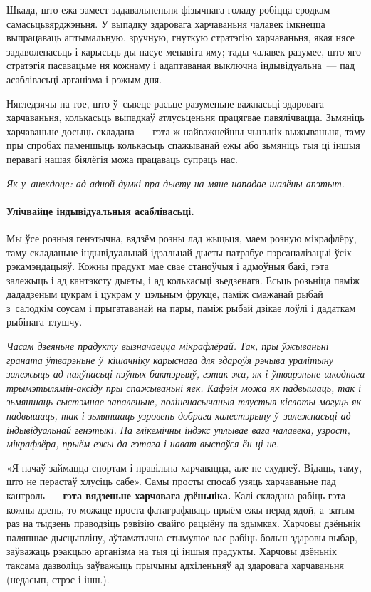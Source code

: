 Шкада, што ежа замест задавальненьня фізычнага голаду робіцца сродкам самасьцьвярджэньня. У выпадку здаровага харчаваньня чалавек імкнецца выпрацаваць аптымальную, зручную, гнуткую стратэгію харчаваньня, якая нясе задаволенасьць і карысьць ды пасуе менавіта яму; тады чалавек разумее, што яго стратэгія пасавацьме ня кожнаму і адаптаваная выключна індывідуальна~--- пад асаблівасьці арганізма і рэжым дня.

Нягледзячы на тое, што ў~сьвеце расьце разуменьне важнасьці здаровага харчаваньня, колькасьць выпадкаў атлусьценьня працягвае павялічвацца. Зьмяніць харчаваньне досыць складана~--- гэта ж найважнейшы чыньнік выжываньня, таму пры спробах паменшыць колькасьць спажыванай ежы або зьмяніць тыя ці іншыя перавагі нашая біялёгія можа працаваць супраць нас. 

\emph{Як у~анекдоце: ад адной думкі пра дыету на мяне нападае шалёны апэтыт.}

\paragraph{Улічвайце індывідуальныя асаблівасьці.} Мы ўсе розныя генэтычна, вядзём розны лад жыцьця, маем розную мікрафлёру, таму складаньне індывідуальнай ідэальнай дыеты патрабуе пэрсаналізацыі ўсіх рэкамэндацыяў. Кожны прадукт мае свае станоўчыя і адмоўныя бакі, гэта залежыць і ад кантэксту дыеты, і ад колькасьці зьедзенага. Ёсьць розьніца паміж дададзеным цукрам і цукрам у~цэльным фрукце, паміж смажанай рыбай з~салодкім соусам і прыгатаванай на пары, паміж рыбай дзікае лоўлі і дадаткам рыбінага тлушчу.

\emph{Часам дзеяньне прадукту вызначаецца мікрафлёрай. Так, пры ўжываньні граната ўтварэньне ў~кішачніку карыснага для здароўя рэчыва уралітыну залежыць ад наяўнасьці пэўных бактэрыяў, гэтак жа, як і ўтварэньне шкоднага трымэтылямін-аксіду пры спажываньні яек. Кафэін можа як падвышаць, так і зьмяншаць сыстэмнае запаленьне, поліненасычаныя тлустыя кіслоты могуць як падвышаць, так і зьмяншаць узровень добрага халестэрыну ў~залежнасьці ад індывідуальнай генэтыкі. На глікемічны індэкс уплывае вага чалавека, узрост, мікрафлёра, прыём ежы да гэтага і нават выспаўся ён ці не.}

«Я пачаў займацца спортам і правільна харчавацца, але не схуднеў. Відаць, таму, што не перастаў хлусіць сабе». Самы просты спосаб узяць харчаваньне пад кантроль~--- \textbf{гэта вядзеньне харчовага дзёньніка.} Калі складана рабіць гэта кожны дзень, то можаце проста фатаграфаваць прыём ежы перад ядой, а~затым раз на тыдзень праводзіць рэвізію свайго рацыёну па здымках. Харчовы дзёньнік паляпшае дысцыпліну, аўтаматычна стымулюе вас рабіць больш здаровы выбар, заўважаць рэакцыю арганізма на тыя ці іншыя прадукты. Харчовы дзёньнік таксама дазволіць заўважыць прычыны адхіленьняў ад здаровага харчаваньня (недасып, стрэс і інш.). 

